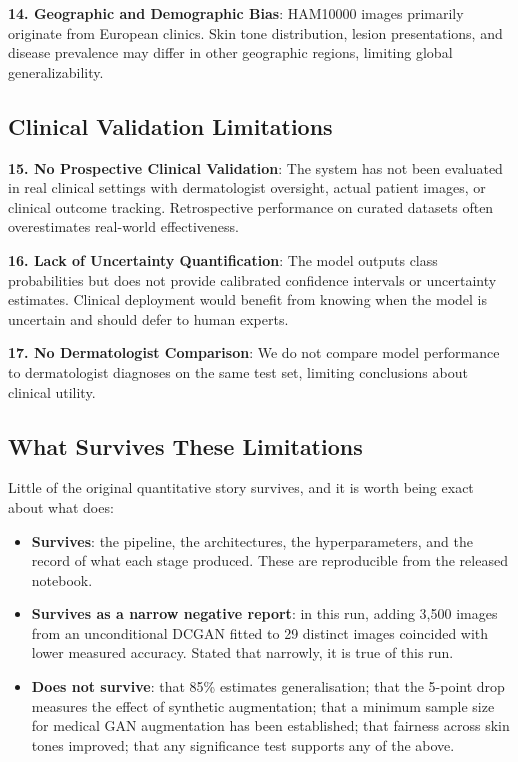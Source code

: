 \documentclass[ai,article,submit,pdftex,moreauthors]{Definitions/mdpi}
\begin{document}
\textbf{14. Geographic and Demographic Bias}: HAM10000 images primarily originate from European clinics. Skin tone distribution, lesion presentations, and disease prevalence may differ in other geographic regions, limiting global generalizability.

\subsection{Clinical Validation Limitations}

\textbf{15. No Prospective Clinical Validation}: The system has not been evaluated in real clinical settings with dermatologist oversight, actual patient images, or clinical outcome tracking. Retrospective performance on curated datasets often overestimates real-world effectiveness.

\textbf{16. Lack of Uncertainty Quantification}: The model outputs class probabilities but does not provide calibrated confidence intervals or uncertainty estimates. Clinical deployment would benefit from knowing when the model is uncertain and should defer to human experts.

\textbf{17. No Dermatologist Comparison}: We do not compare model performance to dermatologist diagnoses on the same test set, limiting conclusions about clinical utility.

\subsection{What Survives These Limitations}

Little of the original quantitative story survives, and it is worth being exact about what does:
\begin{itemize}[leftmargin=*, itemsep=2pt]
    \item \textbf{Survives}: the pipeline, the architectures, the hyperparameters, and the record of what each stage produced. These are reproducible from the released notebook.
    \item \textbf{Survives as a narrow negative report}: in this run, adding 3,500 images from an unconditional DCGAN fitted to 29 distinct images coincided with lower measured accuracy. Stated that narrowly, it is true of this run.
    \item \textbf{Does not survive}: that 85\% estimates generalisation; that the 5-point drop measures the effect of synthetic augmentation; that a minimum sample size for medical GAN augmentation has been established; that fairness across skin tones improved; that any significance test supports any of the above.
\end{itemize}
\end{document}
